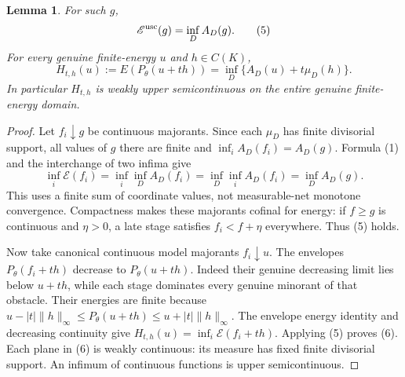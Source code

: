 \documentclass[11pt]{article}
\newtheorem{lemma}[theorem]{Lemma}
\begin{document}
\begin{lemma}
For such $g$,
\[
             \mathscr E^{\rm usc}(g)=\inf_D A_D(g).       \tag{5}
\]
For every genuine finite-energy $u$ and $h\in C(K)$,
\[
 H_{t,h}(u):=E(P_\theta(u+th))
       =\inf_D\{A_D(u)+t\mu_D(h)\}.                      \tag{6}
\]
In particular $H_{t,h}$ is weakly upper semicontinuous
on the entire genuine finite-energy domain.
\end{lemma}
\begin{proof}
Let $f_i\downarrow g$ be continuous majorants. Since each
$\mu_D$ has finite divisorial support, all values of $g$
there are finite and
$\inf_i A_D(f_i)=A_D(g)$. Formula (1) and the interchange
of two infima give
\[
 \inf_i\mathscr E(f_i)=\inf_i\inf_D A_D(f_i)
                    =\inf_D\inf_i A_D(f_i)=\inf_D A_D(g).
\]
This uses a finite sum of coordinate values, not measurable-net
monotone convergence. Compactness makes these majorants
cofinal for energy: if $f\geq g$ is continuous and $\eta>0$,
a late stage satisfies $f_i<f+\eta$ everywhere. Thus (5) holds.

Now take canonical continuous model majorants $f_i\downarrow u$.
The envelopes $P_\theta(f_i+th)$ decrease to
$P_\theta(u+th)$. Indeed their genuine decreasing limit lies
below $u+th$, while each stage dominates every genuine
minorant of that obstacle. Their energies are finite because
$u-|t|\|h\|_\infty\leq P_\theta(u+th)\leq
u+|t|\|h\|_\infty$.
The envelope energy identity and decreasing continuity give
$H_{t,h}(u)=\inf_i\mathscr E(f_i+th)$.
Applying (5) proves (6).
Each plane in (6) is weakly continuous: its measure has
fixed finite divisorial support. An infimum of continuous
functions is upper semicontinuous.
\end{proof}
\end{document}
